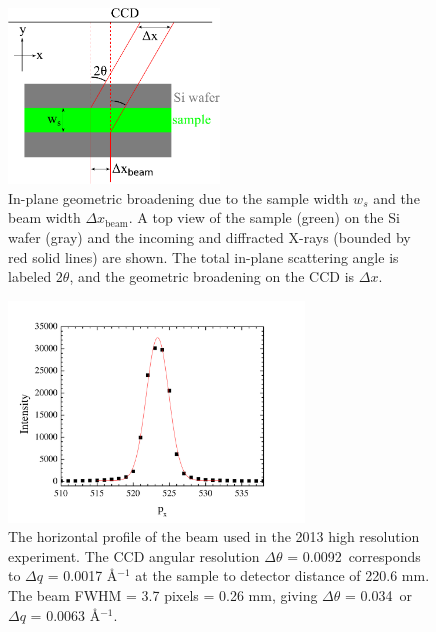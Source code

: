\begin{figure}[htbp]
  \centering
  \includegraphics[width=0.5\textwidth]{figures/ripple/MMs/waxs/geometric_broadening}
  \caption{In-plane geometric broadening due to the sample width $w_s$ and the beam width $\Delta x_\textrm{beam}$.
  A top view of the sample (green) on the Si wafer (gray) and the
  incoming and diffracted X-rays (bounded by red solid lines)
  are shown. The total in-plane scattering
  angle is labeled $2\theta$, and 
  the geometric broadening on the CCD is $\Delta x$.}
  \label{fig:geometric_broadening}
\end{figure}

\begin{figure}[htbp]
  \centering
  \includegraphics[width=0.7\textwidth]{figures/ripple/MMs/waxs/beamx_hr}
  \caption{The horizontal profile of the beam used in the 2013 high resolution 
  experiment. The CCD angular resolution $\Delta\theta$ = 0.0092\textdegree\,
  corresponds to $\Delta q$ = 0.0017 \AA$^{-1}$ at the sample to detector
  distance of 220.6 mm. The beam FWHM = 3.7 pixels = 0.26 mm, giving
  $\Delta\theta$ = 0.034\textdegree\ or $\Delta q$ = 0.0063 \AA$^{-1}$. }
  \label{fig:nGIWAXS_beamx}
\end{figure} 


